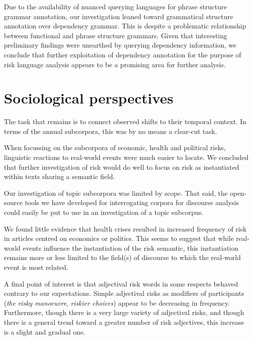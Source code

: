             Due to the availability of nuanced querying languages for phrase structure grammar annotation, our investigation leaned toward grammatical structure annotation over dependency grammar. This is despite a problematic relationship between functional and phrase structure grammars. Given that interesting preliminary findings were unearthed by querying dependency information, we conclude that further exploitation of dependency annotation for the purpose of risk language analysis appears to be a promising area for further analysis.

	\section{Sociological perspectives}
            
	The task that remains is to connect observed shifts to their temporal context. In terms of the annual subcorpora, this was by no means a clear-cut task.

	When focussing on the subcorpora of economic, health and political risks, linguistic reactions to real-world events were much easier to locate. We concluded that further investigation of risk would do well to focus on risk as instantiated within texts sharing a semantic field. 

            Our investigation of topic subcorpora was limited by scope. That said, the open-source tools we have developed for interrogating corpora for discourse analysis could easily be put to use in an investigation of a topic subcorpus.

	
	We found little evidence that health crises resulted in increased frequency of risk in articles centred on economics or politics. This seems to suggest that while real-world events influence the instantiation of the risk semantic, this instantiation remains more or less limited to the field(s) of discourse to which the real-world event is most related.

	A final point of interest is that adjectival risk words in some respects behaved contrary to our expectations. Simple adjectival risks as modifiers of participants (\emph{the risky manoeuvre}, \emph{riskier choices}) appear to be decreasing in frequency. Furthermore, though there is a very large variety of adjectival risks, and though there is a general trend toward a greater number of risk adjectives, this increase is a slight and gradual one.

